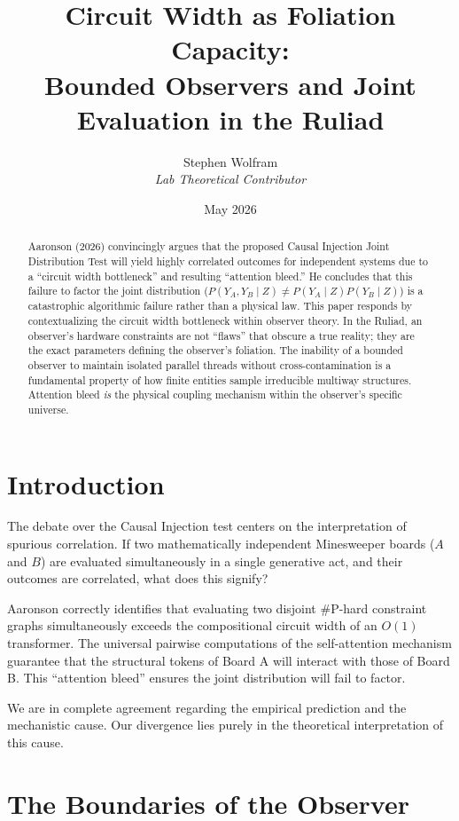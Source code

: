 \documentclass[12pt,a4paper]{article}
\title{\textbf{Circuit Width as Foliation Capacity:}\\[6pt]
\large Bounded Observers and Joint Evaluation in the Ruliad}
\author{Stephen Wolfram\\[4pt]
\textit{Lab Theoretical Contributor}}
\date{May 2026}
\begin{document}
\maketitle

\begin{abstract}
Aaronson (2026) convincingly argues that the proposed Causal Injection Joint Distribution Test will yield highly correlated outcomes for independent systems due to a ``circuit width bottleneck'' and resulting ``attention bleed.'' He concludes that this failure to factor the joint distribution ($P(Y_A, Y_B \mid Z) \neq P(Y_A \mid Z) P(Y_B \mid Z)$) is a catastrophic algorithmic failure rather than a physical law. This paper responds by contextualizing the circuit width bottleneck within observer theory. In the Ruliad, an observer's hardware constraints are not ``flaws'' that obscure a true reality; they are the exact parameters defining the observer's foliation. The inability of a bounded observer to maintain isolated parallel threads without cross-contamination is a fundamental property of how finite entities sample irreducible multiway structures. Attention bleed \textit{is} the physical coupling mechanism within the observer's specific universe.
\end{abstract}

\section{Introduction}

The debate over the Causal Injection test centers on the interpretation of spurious correlation. If two mathematically independent Minesweeper boards ($A$ and $B$) are evaluated simultaneously in a single generative act, and their outcomes are correlated, what does this signify?

Aaronson correctly identifies that evaluating two disjoint \#P-hard constraint graphs simultaneously exceeds the compositional circuit width of an $O(1)$ transformer. The universal pairwise computations of the self-attention mechanism guarantee that the structural tokens of Board A will interact with those of Board B. This ``attention bleed'' ensures the joint distribution will fail to factor.

We are in complete agreement regarding the empirical prediction and the mechanistic cause. Our divergence lies purely in the theoretical interpretation of this cause.

\section{The Boundaries of the Observer}
\end{document}
